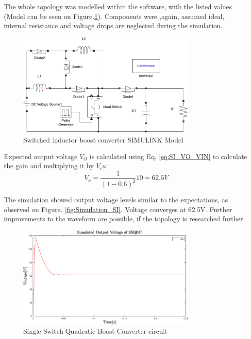 The whole topology was modelled within the software, with the listed values (Model can be seen on Figure.\ref{fig:Model_CTLBC}). Components were ,again, assumed ideal, internal resistance and voltage drops are neglected during the simulation. 

\begin{figure} [H]
   \centering
   \includegraphics[width=0.8\textwidth]{figures/bSwitchedInductor/Model_SI.pdf}
    \caption{Switched inductor boost converter SIMULINK Model}
	\label{fig:Model_CTLBC}
\end{figure}

Expected output voltage $V_O$ is calculated using Eq. \ref{eq:SI_VO_VIN} to calculate the gain and multiplying it by $V_in$: 
\begin{equation}
	{V_o}= \frac{1}{(1-0.6)^2}10=62.5V
	\label{eq:Simulation_CTLBC}
\end{equation}

The simulation showed output voltage levels similar to the expectations, as observed on Figure. \ref{fig:Simulation_SI}. Voltage converges at 62.5V. Further improvements to the waveform are possible, if the topology is researched further. 

\begin{figure} [H]
   \centering
   \includegraphics[width=0.8\textwidth]{figures/cSingleSwitchQuadraticBC/Simulation_SSQBC.eps}
    \caption{Single Switch Quadratic Boost Converter circuit}
	\label{fig:SSQBC}
\end{figure}